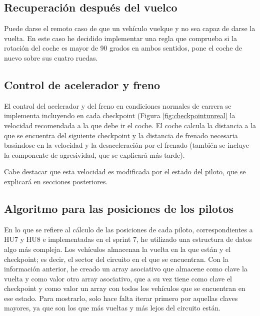 \subsection{Recuperación después del vuelco}

Puede darse el remoto caso de que un vehículo vuelque y no sea capaz de darse la vuelta. En este caso he decidido implementar una regla que comprueba si la rotación del coche es mayor de 90 grados en ambos sentidos, pone el coche de nuevo sobre sus cuatro ruedas.

\subsection{Control de acelerador y freno}

El control del acelerador y del freno en condiciones normales de carrera se implementa incluyendo en cada checkpoint (Figura \ref{fig:checkpointunreal} la velocidad recomendada a la que debe ir el coche. El coche calcula la distancia a la que se encuentra del siguiente checkpoint y la distancia de frenado necesaria basándose en la velocidad y la desaceleración por el frenado (también se incluye la componente de agresividad, que se explicará más tarde).

\bigskip

Cabe destacar que esta velocidad es modificada por el estado del piloto, que se explicará en secciones posteriores.

\subsection{Algoritmo para las posiciones de los pilotos}

En lo que se refiere al cálculo de las posiciones de cada piloto, correspondientes a HU7 y HU8 e implementadas en el sprint 7, he utilizado una estructura de datos algo más compleja. Los vehículos almacenan la vuelta en la que están y el checkpoint; es decir, el sector del circuito en el que se encuentran. Con la información anterior, he creado un array asociativo que almacene como clave la vuelta y como valor otro array asociativo, que a su vez tiene como clave el checkpoint y como valor un array con todos los vehículos que se encuentran en ese estado. Para mostrarlo, solo hace falta iterar primero por aquellas claves mayores, ya que son los que más vueltas y más lejos del circuito están.

